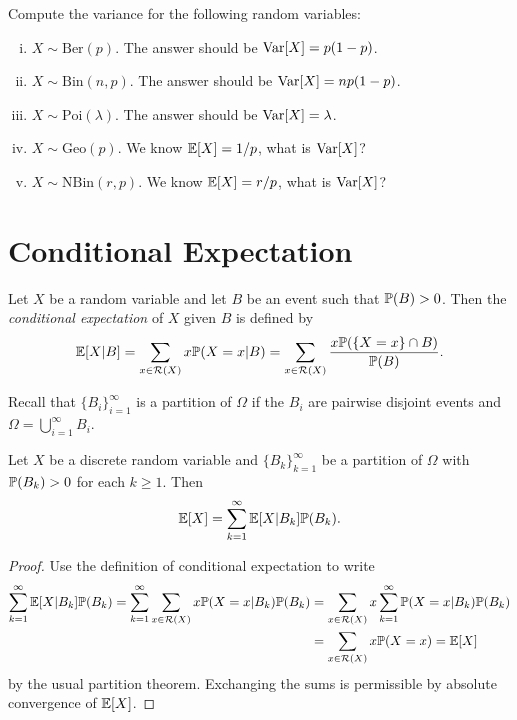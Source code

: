 \begin{exercise}
  Compute the variance for the following random
  variables:
  \begin{enumerate}[(i)]
    \item $X \sim \mathrm{Ber}(p)$.
      The answer should be $\operatorname{Var}[X] = p(1 - p)$.
    \item $X \sim \mathrm{Bin}(n, p)$.
      The answer should be $\operatorname{Var}[X] = np(1 - p)$.
    \item $X \sim \mathrm{Poi}(\lambda)$.
      The answer should be $\operatorname{Var}[X] = \lambda$.
    \item $X \sim \mathrm{Geo}(p)$.
      We know $\mathbb{E}[X] = 1 / p$, what is $\operatorname{Var}[X]$?
    \item $X \sim \mathrm{NBin}(r, p)$.
      We know $\mathbb{E}[X] = r / p$, what is
      $\operatorname{Var}[X]$?
  \end{enumerate}
\end{exercise}

\section{Conditional Expectation}
\begin{definition}
  Let $X$ be a random variable and let
  $B$ be an event such that $\mathbb{P}(B) > 0$.
  Then the \emph{conditional expectation} of $X$ given
  $B$ is defined by
  \[
    \mathbb{E}[X | B]
    = \sum_{x \in \mathcal{R}(X)} x \mathbb{P}(X = x | B)
    = \sum_{x \in \mathcal{R}(X)} \frac{x \mathbb{P}(\{X = x\} \cap B)}{\mathbb{P}(B)}.
  \]
\end{definition}

\begin{remark}
  Recall that $\{B_i\}_{i = 1}^\infty$ is
  a partition of $\Omega$ if the $B_i$
  are pairwise disjoint events and
  $\Omega = \bigcup_{i = 1}^\infty B_i$.
\end{remark}

\begin{theorem}
  Let $X$ be a discrete random variable and
  $\{B_k\}_{k = 1}^\infty$ be a partition of
  $\Omega$ with $\mathbb{P}(B_k) > 0$ for each $k \ge 1$.
  Then
  \[
    \mathbb{E}[X] = \sum_{k = 1}^\infty \mathbb{E}[X | B_k] \mathbb{P}(B_k).
  \]
\end{theorem}

\begin{proof}
  Use the definition of conditional expectation to
  write
  \begin{align*}
    \sum_{k = 1}^\infty \mathbb{E}[X | B_k] \mathbb{P}(B_k)
    = \sum_{k = 1}^\infty \sum_{x \in \mathcal{R}(X)} x \mathbb{P}(X = x | B_k) \mathbb{P}(B_k)
    &= \sum_{x \in \mathcal{R}(X)} x \sum_{k = 1}^\infty  \mathbb{P}(X = x | B_k) \mathbb{P}(B_k) \\
    &=  \sum_{x \in \mathcal{R}(X)} x \mathbb{P}(X = x)
    = \mathbb{E}[X]
  \end{align*}
  by the usual partition theorem. Exchanging
  the sums is permissible by absolute convergence
  of $\mathbb{E}[X]$.
\end{proof}

